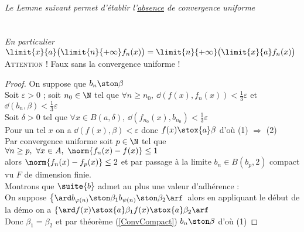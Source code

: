 \vspace*{0.5cm} \\ \textit{Le Lemme suivant permet d'établir l'\underline{absence} de convergence uniforme}
    \\ 		
\vspace*{0.5cm} \\ 
    \\\textit{\small En particulier $\limit{x}{a} \big(\limit{n}{+\infty} f_n(x)\big) = \limit{n}{+\infty} \big( \limit{x}{a} f_n(x) \big) $}
    \vspace*{0.2cm}\\\textsc{Attention !} Faux sans la convergence uniforme !
    \begin{proof}
    On suppose que $b_n \ston \beta$ \\ Soit $\varepsilon >0$ ; soit $n_0\in \N$ tel que $\forall n\geq n_0 ,~\dd (f(x),f_n(x) ) <\frac{1}{3}
    \varepsilon$ et $\dd (b_n ,\beta )< \frac{1}{3}\varepsilon$ \\ Soit $\delta >0$ tel que $\forall x\in B(a,\delta ) ,~\dd (f_{n_0}(x) , 
    b_{n_0})<\frac{1}{3}\varepsilon$ \\ Pour un tel $x$ on a $\dd (f(x),\beta ) <\varepsilon$ donc $f(x) \stox{a} \beta$ d'où {\tiny (1)} $
    \Rightarrow$ {\tiny (2)} \vspace*{0.3cm} \\ Par convergence uniforme soit $p\in\N$ tel que $\forall n\geq p ,~\forall x\in A 
    ,~\norm{f_n(x)-f(x)}\leq 1$ \\alors $\norm{f_n(x)-f_p(x)} \leq 2$ et par passage à la limite $b_n\in B(b_p ,2)$ compact vu $F$ de dimension 
    finie. \\Montrons que $\suite{b}$ admet au plus une valeur d'adhérence : 
    \\On suppose $\left\{ \ard b_{\varphi (n)} \ston \beta_1 \\ b_{\psi (n)} \ston \beta_2 \arf \right.$ alors en appliquant le début de la 
    démo on a $\left\{\ard f(x) \stox{a} \beta_1 \\ f(x) \stox{a} \beta_2 \arf \right.$ \\ Donc $\beta_1 = \beta_2$ et par théorème 
    (\ref{ConvCompact}) $b_n \ston \beta$ d'où {\tiny (1)}
    \end{proof}
\traitd
